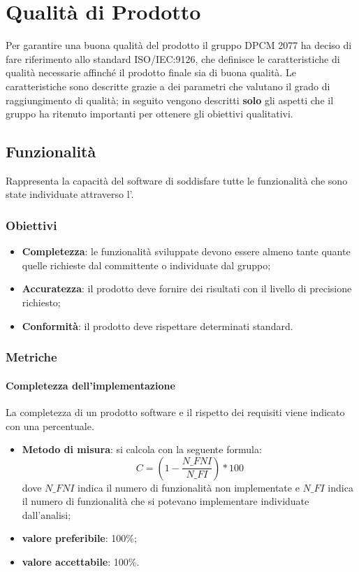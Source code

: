 \section{Qualità di Prodotto}

Per garantire una buona qualità del prodotto il gruppo DPCM 2077 ha deciso di fare riferimento allo standard ISO/IEC:9126,
che definisce le caratteristiche di qualità necessarie affinché il prodotto finale sia di buona qualità.
Le caratteristiche sono descritte grazie a dei parametri che valutano il grado di raggiungimento di qualità; in seguito vengono descritti \textbf{solo} gli aspetti che il gruppo ha ritenuto importanti per ottenere gli obiettivi qualitativi.

\subsection{Funzionalità}
Rappresenta la capacità del software di soddisfare tutte le funzionalità che sono state individuate attraverso l'.
\subsubsection{Obiettivi}
\begin{itemize}
\item {\textbf{Completezza}: le funzionalità sviluppate devono essere almeno tante quante quelle richieste dal committente o individuate dal gruppo;}
\item {\textbf{Accuratezza}: il prodotto deve fornire dei risultati con il livello di precisione richiesto;}
\item {\textbf{Conformità}: il prodotto deve rispettare determinati standard.} 
\end{itemize}

\subsubsection{Metriche}
\paragraph{Completezza dell'implementazione}
La completezza di un prodotto software e il rispetto dei requisiti viene indicato con una percentuale.
\begin{itemize}
\item \textbf{Metodo di misura}: si calcola con la seguente formula:
\[C = (1- \frac{N\_FNI}{N\_FI}) * 100\]
dove $N\_FNI$ indica il numero di funzionalità non implementate e $N\_FI$ indica il numero di funzionalità che si potevano implementare individuate dall'analisi;
\item \textbf{valore preferibile}: 100\%;
\item \textbf{valore accettabile}: 100\%.
\end{itemize}

